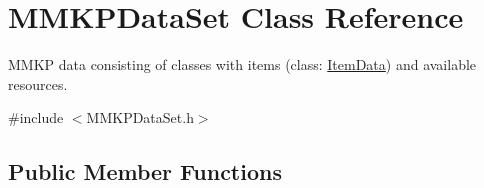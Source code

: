 \hypertarget{class_m_m_k_p_data_set}{\section{M\+M\+K\+P\+Data\+Set Class Reference}
\label{class_m_m_k_p_data_set}
}


M\+M\+K\+P data consisting of classes with items (class\+: \hyperlink{class_item_data}{Item\+Data}) and available resources.  




{\ttfamily \#include $<$M\+M\+K\+P\+Data\+Set.\+h$>$}

\subsection*{Public Member Functions}
